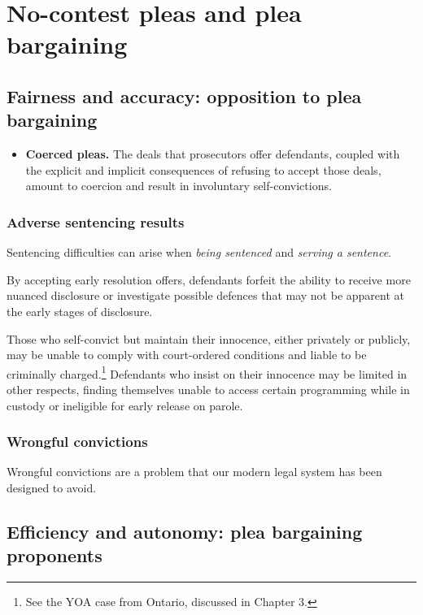 \section{No-contest pleas and plea bargaining}






\subsection{Fairness and accuracy: opposition to plea bargaining}

\begin{itemize}
\item \textbf{Coerced pleas.} The deals that prosecutors offer defendants, coupled with the explicit and implicit consequences of refusing to accept those deals, amount to coercion and result in involuntary self-convictions.
\end{itemize}

\subsubsection{Adverse sentencing results}

Sentencing difficulties can arise when \textit{being sentenced} and \textit{serving a sentence}. 

By accepting early resolution offers, defendants forfeit the ability to receive more nuanced disclosure or investigate possible defences that may not be apparent at the early stages of disclosure.

Those who self-convict but maintain their innocence, either privately or publicly, may be unable to comply with court-ordered conditions and liable to be criminally charged.\footnote{See the YOA case from Ontario, discussed in Chapter 3.} Defendants who insist on their innocence may be limited in other respects, finding themselves unable to access certain programming while in custody or ineligible for early release on parole. 

\subsubsection{Wrongful convictions}

Wrongful convictions are a problem that our modern legal system has been designed to avoid.

\subsection{Efficiency and autonomy: plea bargaining proponents}

